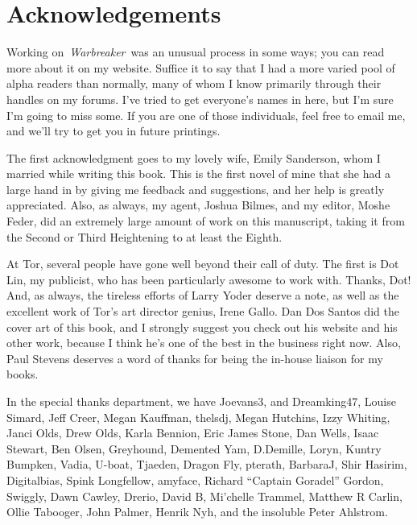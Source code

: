 \chapter{Acknowledgements}

Working on~\textit{Warbreaker}~was an unusual process in some ways; you can read more about it on my website. Suffice it to say that I had a more varied pool of alpha readers than normally, many of whom I know primarily through their handles on my forums. I’ve tried to get everyone’s names in here, but I’m sure I’m going to miss some. If you are one of those individuals, feel free to email me, and we’ll try to get you in future printings.

The first acknowledgment goes to my lovely wife, Emily Sanderson, whom I married while writing this book. This is the first novel of mine that she had a large hand in by giving me feedback and suggestions, and her help is greatly appreciated. Also, as always, my agent, Joshua Bilmes, and my editor, Moshe Feder, did an extremely large amount of work on this manuscript, taking it from the Second or Third Heightening to at least the Eighth.

At Tor, several people have gone well beyond their call of duty. The first is Dot Lin, my publicist, who has been particularly awesome to work with. Thanks, Dot! And, as always, the tireless efforts of Larry Yoder deserve a note, as well as the excellent work of Tor’s art director genius, Irene Gallo. Dan Dos Santos did the cover art of this book, and I strongly suggest you check out his website and his other work, because I think he’s one of the best in the business right now. Also, Paul Stevens deserves a word of thanks for being the in-house liaison for my books.

In the special thanks department, we have Joevans3, and Dreamking47, Louise Simard, Jeff Creer, Megan Kauffman, thelsdj, Megan Hutchins, Izzy Whiting, Janci Olds, Drew Olds, Karla Bennion, Eric James Stone, Dan Wells, Isaac Stewart, Ben Olsen, Greyhound, Demented Yam, D.Demille, Loryn, Kuntry Bumpken, Vadia, U-boat, Tjaeden, Dragon Fly, pterath, BarbaraJ, Shir Hasirim, Digitalbias, Spink Longfellow, amyface, Richard “Captain Goradel” Gordon, Swiggly, Dawn Cawley, Drerio, David B, Mi’chelle Trammel, Matthew R Carlin, Ollie Tabooger, John Palmer, Henrik Nyh, and the insoluble Peter Ahlstrom.

